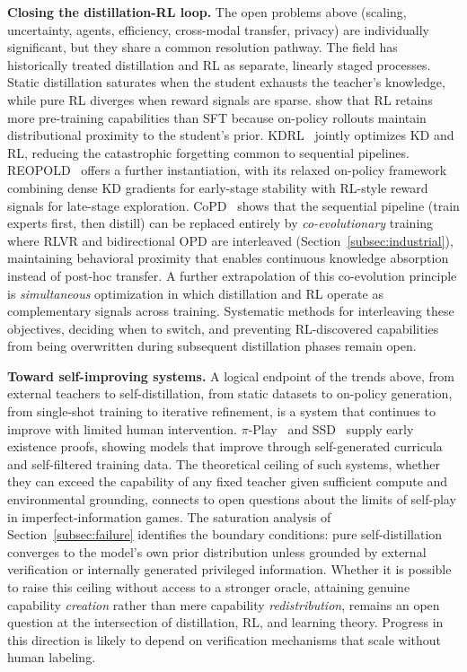 \documentclass{article} %
\begin{document}
\textbf{Closing the distillation-RL loop.} The open problems above (scaling, uncertainty, agents, efficiency, cross-modal transfer, privacy) are individually significant, but they share a common resolution pathway. The field has historically treated distillation and RL as separate, linearly staged processes. Static distillation saturates when the student exhausts the teacher's knowledge, while pure RL diverges when reward signals are sparse. \citet{2510.18874} show that RL retains more pre-training capabilities than SFT because on-policy rollouts maintain distributional proximity to the student's prior. KDRL~\citep{2506.02208} jointly optimizes KD and RL, reducing the catastrophic forgetting common to sequential pipelines. REOPOLD~\citep{2603.11137} offers a further instantiation, with its relaxed on-policy framework combining dense KD gradients for early-stage stability with RL-style reward signals for late-stage exploration. CoPD~\citep{2604.27083} shows that the sequential pipeline (train experts first, then distill) can be replaced entirely by \emph{co-evolutionary} training where RLVR and bidirectional OPD are interleaved (Section~\ref{subsec:industrial}), maintaining behavioral proximity that enables continuous knowledge absorption instead of post-hoc transfer. A further extrapolation of this co-evolution principle is \emph{simultaneous} optimization in which distillation and RL operate as complementary signals across training. Systematic methods for interleaving these objectives, deciding when to switch, and preventing RL-discovered capabilities from being overwritten during subsequent distillation phases remain open.

\textbf{Toward self-improving systems.} A logical endpoint of the trends above, from external teachers to self-distillation, from static datasets to on-policy generation, from single-shot training to iterative refinement, is a system that continues to improve with limited human intervention. $\pi$-Play~\citep{2604.14054} and SSD~\citep{2604.01193} supply early existence proofs, showing models that improve through self-generated curricula and self-filtered training data. The theoretical ceiling of such systems, whether they can exceed the capability of any fixed teacher given sufficient compute and environmental grounding, connects to open questions about the limits of self-play in imperfect-information games. The saturation analysis of Section~\ref{subsec:failure} identifies the boundary conditions: pure self-distillation converges to the model's own prior distribution unless grounded by external verification or internally generated privileged information. Whether it is possible to raise this ceiling without access to a stronger oracle, attaining genuine capability \emph{creation} rather than mere capability \emph{redistribution}, remains an open question at the intersection of distillation, RL, and learning theory. Progress in this direction is likely to depend on verification mechanisms that scale without human labeling.
\end{document}
